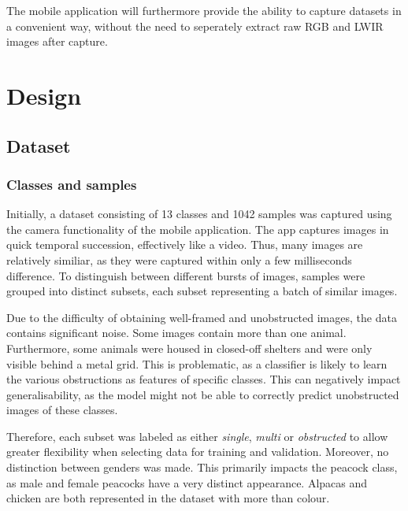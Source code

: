 \documentclass{l4proj}
\begin{document}
The mobile application will furthermore provide the ability to capture datasets in a convenient way, without the need to seperately extract raw RGB and LWIR images after capture.



\chapter{Design}
\label{design}

\section{Dataset}

\subsection{Classes and samples}
\label{classes_samples}

Initially, a dataset consisting of 13 classes and 1042 samples was captured using the camera functionality of the mobile application. The app captures images in quick temporal succession, effectively like a video. Thus, many images are relatively similiar, as they were captured within only a few milliseconds difference. To distinguish between different bursts of images, samples were grouped into distinct subsets, each subset representing a batch of similar images.

Due to the difficulty of obtaining well-framed and unobstructed images, the data contains significant noise. Some images contain more than one animal. Furthermore, some animals were housed in closed-off shelters and were only visible behind a metal grid. This is problematic, as a classifier is likely to learn the various obstructions as features of specific classes. This can negatively impact generalisability, as the model might not be able to correctly predict unobstructed images of these classes.

Therefore, each subset was labeled as either \textit{single}, \textit{multi} or \textit{obstructed} to allow greater flexibility when selecting data for training and validation. Moreover, no distinction between genders was made. This primarily impacts the peacock class, as male and female peacocks have a very distinct appearance. Alpacas and chicken are both represented in the dataset with more than colour.
\end{document}
